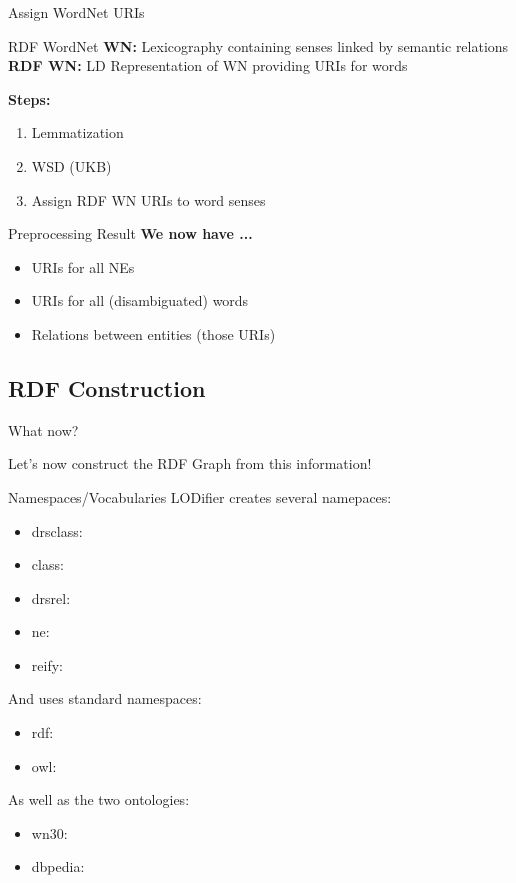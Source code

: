\documentclass[11pt]{beamer}
\begin{document}
		\begin{frame}{Assign WordNet URIs}
			\begin{block}{RDF WordNet}
				\textbf{WN:} Lexicography containing senses linked by semantic relations\\
				\textbf{RDF WN:} LD Representation of WN providing URIs for words
			\end{block}
			
			\textbf{Steps:}\\
			\begin{enumerate}
				\item Lemmatization
				\item WSD (UKB)
				\item Assign RDF WN URIs to word senses			
			\end{enumerate}						
		\end{frame}		
		
		\begin{frame}{Preprocessing Result}
			\textbf{We now have ...}
			\begin{itemize}
				\item URIs for all NEs
				\item URIs for all (disambiguated) words
				\item Relations between entities (those URIs)
			\end{itemize}
		\end{frame}				
		
	\subsection{RDF Construction}

		\begin{frame}{What now?}
			\begin{center}
				Let's now construct the RDF Graph from this information!
			\end{center}
		\end{frame}			

		\begin{frame}{Namespaces/Vocabularies}
			LODifier creates several namepaces:
			\begin{itemize}
				\item drsclass:
				\item class:
				\item drsrel:
				\item ne:
				\item reify:
			\end{itemize}
			
			And uses standard namespaces:
			\begin{itemize}
				\item rdf:
				\item owl:
			\end{itemize}
			
			As well as the two ontologies:
			\begin{itemize}
				\item wn30:
				\item dbpedia:
			\end{itemize}
		\end{frame}			
\end{document}
